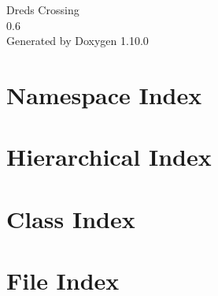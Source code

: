 \documentclass[twoside]{book}
\newcommand{\+}{\discretionary{\mbox{\scriptsize$\hookleftarrow$}}{}{}}
\newcommand{\clearemptydoublepage}{%
    \newpage{\pagestyle{empty}\cleardoublepage}%
  }
\begin{document}
  \raggedbottom
    \hypersetup{pageanchor=false,
                bookmarksnumbered=true,
                pdfencoding=unicode
               }
  \begin{titlepage}
  \vspace*{7cm}
  \begin{center}%
  {\Large Dreds Crossing}\\
  [1ex]\large 0.\+6 \\
  \vspace*{1cm}
  {\large Generated by Doxygen 1.10.0}\\
  \end{center}
  \end{titlepage}
  \clearemptydoublepage
  \tableofcontents
  \clearemptydoublepage
  \hypersetup{pageanchor=true}
\chapter{Namespace Index}

\chapter{Hierarchical Index}

\chapter{Class Index}

\chapter{File Index}

\end{document}
